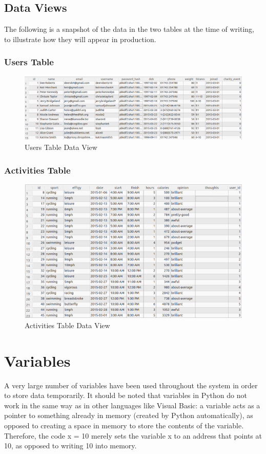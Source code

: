\documentclass{article}[12pt,a4paper]
\begin{document}
\clearpage

\subsection{Data Views}
The following is a snapshot of the data in the two tables at the time of writing, to illustrate how they will appear in production.

\subsubsection{Users Table}
\begin{figure}[h!]
  \includegraphics[scale=0.37]{images/database/users_visual}
  \caption{Users Table Data View}
\end{figure}

\subsubsection{Activities Table}
\begin{figure}[h!]
  \includegraphics[scale=0.37]{images/database/activities_visual}
  \caption{Activities Table Data View}
\end{figure}

\section{Variables}
A very large number of variables have been used throughout the system in order to store data temporarily. It should be noted that variables in Python do not work in the same way as in other languages like Visual Basic: a variable acts as a pointer to something already in memory (created by Python automatically), as opposed to creating a space in memory to store the contents of the variable. Therefore, the code x = 10 merely sets the variable x to an address that points at 10, as opposed to writing 10 into memory.
\end{document}
